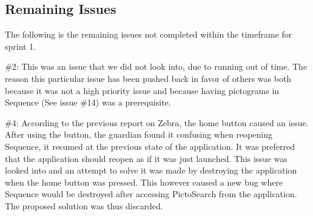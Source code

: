 \subsection{Remaining Issues}\label{subsec:remain_issues}
The following is the remaining issues not completed within the timeframe for sprint 1.

\#2: This was an issue that we did not look into, due to running out of time. The reason this particular issue has been pushed back in favor of others was both because it was not a high priority issue and because having pictograms in Sequence (See issue \#14) was a prerequisite. 

\#4: According to the previous report on Zebra, \citep{Zebra} the home button caused an issue. After using the button, the guardian found it confusing when reopening Sequence, it resumed at the previous state of the application. It was preferred that the application should reopen as if it was just launched. This issue was looked into and an attempt to solve it was made by destroying the application when the home button was pressed. This however caused a new bug where Sequence would be destroyed after accessing PictoSearch from the application. The proposed solution was thus discarded.
